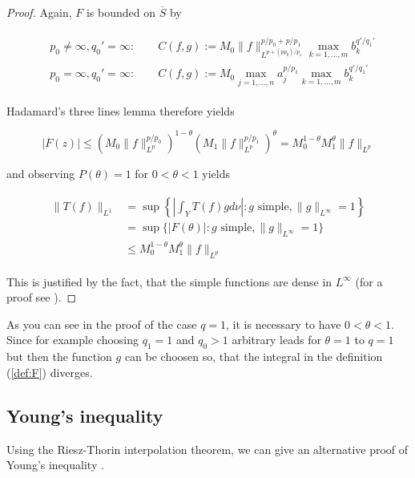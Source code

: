 \begin{proof}
		Again, $F$ is bounded on $\overline{S}$ by 

		\begin{gather*}
			\begin{aligned}
				&p_0 \neq \infty, q_0' = \infty: \qquad C(f,g) :=  M_0 \|f\|_{L^{p + (pp_0)/p_1}}^{p/p_0 + p/p_1} \max_{k = 1,\hdots,m} b_k^{q'/q_1'}\\
				&p_0 = \infty, q_0' = \infty: \qquad C(f,g) := M_0 \max_{j = 1,\hdots,n} a_j^{p/p_1} \max_{k = 1,\hdots,m} b_k^{q'/q_1'}
			\end{aligned}
		\end{gather*}

		Hadamard's three lines lemma therefore yields

		\begin{equation}
			\vert F(z)\vert \leqslant \left(M_0 \|f\|_{L^p}^{p/p_0}\right)^{1 - \theta} \left( M_1 \|f\|_{L^p}^{p/p_1}\right)^\theta =  M_0^{1 - \theta} M_1^\theta \|f\|_{L^p}
		\end{equation}

		and observing $P(\theta) = 1$ for $0 < \theta < 1$ yields

		\begin{gather}
			\begin{aligned}
				\| T(f) \|_{L^1} &= \sup \left\{\left\vert \int_Y T(f)gd\nu \right\vert : g \text{ simple}, \|g\|_{L^{\infty}} = 1 \right\}\\
				&= \sup \{\vert F(\theta) \vert : g \text{ simple}, \|g\|_{L^{\infty}} = 1 \}\\
				&\leqslant  M_0^{1 - \theta} M_1^\theta \|f\|_{L^p}
			\end{aligned}
		\end{gather}

		This is justified by the fact, that the simple functions are dense in $L^{\infty}$ (for a proof see \cite[100]{cohn:measure_theory:2013}).	
\end{proof}

\begin{remark}
	As you can see in the proof of the case $q = 1$, it is necessary to have $0 < \theta < 1$. Since for example choosing $q_1 = 1$ and $q_0 > 1$ arbitrary leads for $\theta = 1$ to $q = 1$ but then the function $g$ can be choosen so, that the integral in the definition \textup{(\ref{def:F})} diverges.
\end{remark}

\subsection{Young's inequality}
Using the Riesz-Thorin interpolation theorem, we can give an alternative proof of Young's inequality \cite[22--23]{grafakos:fourier:2014}.

